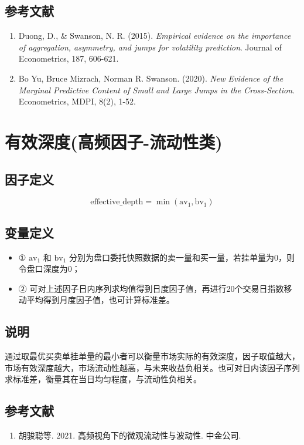 \documentclass{article}
\begin{document}
\subsection{参考文献}
\begin{enumerate}
    \item Duong, D., \& Swanson, N. R. (2015). \textit{Empirical evidence on the importance of aggregation, asymmetry, and jumps for volatility prediction}. Journal of Econometrics, 187, 606-621.
    \item Bo Yu, Bruce Mizrach, Norman R. Swanson. (2020). \textit{New Evidence of the Marginal Predictive Content of Small and Large Jumps in the Cross-Section}. Econometrics, MDPI, 8(2), 1-52.
\end{enumerate}

\section{有效深度(高频因子-流动性类)}

\subsection{因子定义}
\begin{equation}
    \mathrm{effective\_depth} = \min(\mathrm{av}_1, \mathrm{bv}_1)
\end{equation}

\subsection{变量定义}
\begin{itemize}
    \item ① \( \mathrm{av}_1 \) 和 \( \mathrm{bv}_1 \) 分别为盘口委托快照数据的卖一量和买一量，若挂单量为0，则令盘口深度为0；
    \item ② 可对上述因子日内序列求均值得到日度因子值，再进行20个交易日指数移动平均得到月度因子值，也可计算标准差。
\end{itemize}

\subsection{说明}
通过取最优买卖单挂单量的最小者可以衡量市场实际的有效深度，因子取值越大，市场有效深度越大，市场流动性越高，与未来收益负相关。也可对日内该因子序列求标准差，衡量其在当日均匀程度，与流动性负相关。

\subsection{参考文献}
\begin{enumerate}
    \item 胡骏聪等. 2021. 高频视角下的微观流动性与波动性. 中金公司.
\end{enumerate}
\end{document}
